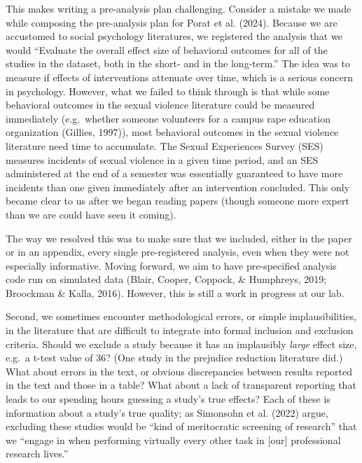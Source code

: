 \documentclass[
  man]{apa6}
\begin{document}
This makes writing a pre-analysis plan challenging. Consider a mistake we made while composing the pre-analysis plan for Porat et al. (2024). Because we are accustomed to social psychology literatures, we registered the analysis that we would ``Evaluate the overall effect size of behavioral outcomes for all of the studies in the dataset, both in the short- and in the long-term.'' The idea was to measure if effects of interventions attenuate over time, which is a serious concern in psychology. However, what we failed to think through is that while some behavioral outcomes in the sexual violence literature could be measured immediately (e.g.~whether someone volunteers for a campus rape education organization (Gillies, 1997)), most behavioral outcomes in the sexual violence literature need time to accumulate. The Sexual Experiences Survey (SES) measures incidents of sexual violence in a given time period, and an SES administered at the end of a semester was essentially guaranteed to have more incidents than one given immediately after an intervention concluded. This only became clear to us after we began reading papers (though someone more expert than we are could have seen it coming).

The way we resolved this was to make sure that we included, either in the paper or in an appendix, every single pre-registered analysis, even when they were not especially informative. Moving forward, we aim to have pre-specified analysis code run on simulated data (Blair, Cooper, Coppock, \& Humphreys, 2019; Broockman \& Kalla, 2016). However, this is still a work in progress at our lab.

Second, we sometimes encounter methodological errors, or simple implausibilities, in the literature that are difficult to integrate into formal inclusion and exclusion criteria. Should we exclude a study because it has an implausibly \emph{large} effect size, e.g.~a t-test value of 36? (One study in the prejudice reduction literature did.) What about errors in the text, or obvious discrepancies between results reported in the text and those in a table? What about a lack of transparent reporting that leads to our spending hours guessing a study's true effects? Each of these is information about a study's true quality; as Simonsohn et al. (2022) argue, excluding these studies would be ``kind of meritocratic screening of research'' that we ``engage in when performing virtually every other task in {[}our{]} professional research lives.''
\end{document}

